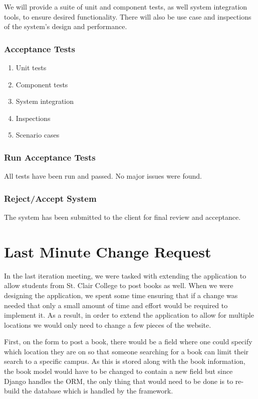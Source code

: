 \documentclass[11pt]{article}
\begin{document}
			We will provide a suite of unit and component tests, as well system integration tools, to ensure desired functionality. 
			There will also be use case and inspections of the system's design and performance.

		\subsubsection{Acceptance Tests}
			\begin{enumerate}
				\item Unit tests
				\item Component tests
				\item System integration
				\item Inspections
				\item Scenario cases
			\end{enumerate}

		\subsubsection{Run Acceptance Tests}
			All tests have been run and passed. No major issues were found.

		\subsubsection{Reject/Accept System}
			The system has been submitted to the client for final review and acceptance.


\newpage
\section{Last Minute Change Request}
\label{sec:last-minute-change-request}

In the last iteration meeting, we were tasked with extending the
application to allow students from St. Clair College to post books as
well. When we were designing the application, we spent some time
ensuring that if a change was needed that only a small amount of time
and effort would be required to implement it. As a result, in order to
extend the application to allow for multiple locations we would only
need to change a few pieces of the website.

First, on the form to post a book, there would be a field where one
could specify which location they are on so that someone searching for
a book can limit their search to a specific campus. As this is stored
along with the book information, the book model would have to be
changed to contain a new field but since Django handles the ORM, the
only thing that would need to be done is to re-build the database
which is handled by the framework.
\end{document}
